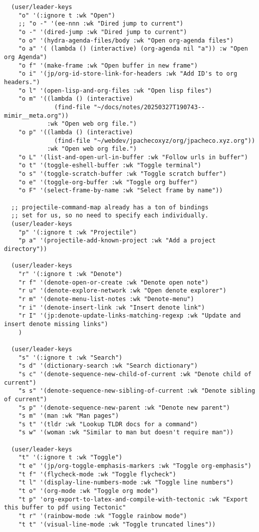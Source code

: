 \documentclass[11pt]{article}
\begin{document}
\begin{verbatim}
  (user/leader-keys
    "o" '(:ignore t :wk "Open")
    ;; "o -" '(ee-nnn :wk "Dired jump to current")
    "o -" '(dired-jump :wk "Dired jump to current")
    "o o" '(hydra-agenda-files/body :wk "Open org-agenda files")
    "o a" '( (lambda () (interactive) (org-agenda nil "a")) :w "Open org Agenda")
    "o f" '(make-frame :wk "Open buffer in new frame")
    "o i" '(jp/org-id-store-link-for-headers :wk "Add ID's to org headers.")
    "o l" '(open-lisp-and-org-files :wk "Open lisp files")
    "o m" '((lambda () (interactive)
              (find-file "~/docs/notes/20250327T190743--mimir__meta.org")) 
            :wk "Open web org file.")
    "o p" '((lambda () (interactive)
              (find-file "~/webdev/jpachecoxyz/org/jpacheco.xyz.org")) 
            :wk "Open web org file.")
    "o L" '(list-and-open-url-in-buffer :wk "Follow urls in buffer")
    "o t" '(toggle-eshell-buffer :wk "Toggle terminal")
    "o s" '(toggle-scratch-buffer :wk "Toggle scratch buffer")
    "o e" '(toggle-org-buffer :wk "Toggle org buffer")
    "o F" '(select-frame-by-name :wk "Select frame by name"))

  ;; projectile-command-map already has a ton of bindings 
  ;; set for us, so no need to specify each individually.
  (user/leader-keys
    "p" '(:ignore t :wk "Projectile")
    "p a" '(projectile-add-known-project :wk "Add a project directory"))

  (user/leader-keys
    "r" '(:ignore t :wk "Denote")
    "r f" '(denote-open-or-create :wk "Denote open note")
    "r u" '(denote-explore-network :wk "Open denote explorer")
    "r m" '(denote-menu-list-notes :wk "Denote-menu")
    "r i" '(denote-insert-link :wk "Insert denote link")
    "r I" '(jp:denote-update-links-matching-regexp :wk "Update and insert denote missing links")
    )

  (user/leader-keys
    "s" '(:ignore t :wk "Search")
    "s d" '(dictionary-search :wk "Search dictionary")
    "s c" '(denote-sequence-new-child-of-current :wk "Denote child of current")
    "s s" '(denote-sequence-new-sibling-of-current :wk "Denote sibling of current")
    "s p" '(denote-sequence-new-parent :wk "Denote new parent")
    "s m" '(man :wk "Man pages")
    "s t" '(tldr :wk "Lookup TLDR docs for a command")
    "s w" '(woman :wk "Similar to man but doesn't require man"))

  (user/leader-keys
    "t" '(:ignore t :wk "Toggle")
    "t e" '(jp/org-toggle-emphasis-markers :wk "Toggle org-emphasis")
    "t f" '(flycheck-mode :wk "Toggle flycheck")
    "t l" '(display-line-numbers-mode :wk "Toggle line numbers")
    "t o" '(org-mode :wk "Toggle org mode")
    "t p" 'org-export-to-latex-and-compile-with-tectonic :wk "Export this buffer to pdf using Tectonic"
    "t r" '(rainbow-mode :wk "Toggle rainbow mode")
    "t t" '(visual-line-mode :wk "Toggle truncated lines"))


\end{verbatim}
\end{document}
